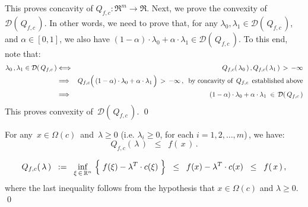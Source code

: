 This proves concavity of $Q_{f,c} : \Re^{m} \longrightarrow \Re$.
\vskip 0.2cm
\noindent
Next, we prove the convexity of $\mathcal{D}(\,Q_{f,c}\,)$.
In other words, we need to prove that,
for any $\lambda_{0}, \lambda_{1} \in \mathcal{D}(\,Q_{f,c}\,)$, and $\alpha\in[0,1]$,
we also have $(1-\alpha)\cdot\lambda_{0}+\alpha\cdot\lambda_{1}\in\mathcal{D}(\,Q_{f,c}\,)$.
To this end, note that:
\begin{eqnarray*}
\lambda_{0}\,, \lambda_{1} \in \mathcal{D}(\,Q_{f,c}\,)
& \Longleftrightarrow &
	Q_{f,c}(\,\lambda_{0}\,)\,, Q_{f,c}(\,\lambda_{1}\,) \, > \, -\infty 
\\
& \Longrightarrow &
	Q_{f,c}\!\left(\,(1-\alpha)\cdot\lambda_{0}\overset{{\color{white}.}}{+}\alpha\cdot\lambda_{1}\,\right)
	\, > \, -\infty\,,\;\;
	\textnormal{by concavity of \,$Q_{f,c}$\, established above}
\\
& \Longrightarrow &
	(1-\alpha)\cdot\lambda_{0}\overset{{\color{white}.}}{+}\alpha\cdot\lambda_{1}
	\;\in\, \mathcal{D}(\,Q_{f,c}\,)
\end{eqnarray*}
This proves convexity of \,$\mathcal{D}(\,Q_{f,c}\,)$.
\qed

\vskip 0.5cm
\begin{theorem}
\mbox{}
\vskip 0.1cm
\noindent
For any \,$x \in \Omega(c)$\, and \,$\lambda \geq 0$ (i.e. $\lambda_{i} \geq 0$, for each $i =1,2,\ldots,m$)\,,
we have:
\begin{equation*}
Q_{f,c}\!\left(\,\lambda\,\right) \;\; \leq \;\; f(\,x\,)\,.
\end{equation*}
\end{theorem}
\proof
\begin{equation*}
Q_{f,c}\!\left(\,\lambda\,\right)
\;\; := \;\;
	\underset{\xi\,\in\,\Re^{n}}{\inf}\,\left\{\;f(\xi) \overset{{\color{white}.}}{-} \lambda^{T}\cdot c(\xi)\;\right\}
\;\; \leq \;\;
	f(x) \overset{{\color{white}.}}{-} \lambda^{T}\cdot c(x)
\;\; \leq \;\;
	f(\,x\,)\,,
\end{equation*}
where the last inequality follows from the hypothesis that $x \in \Omega(c)$ and $\lambda \geq 0$.
\qed


\renewcommand{\theenumi}{\roman{enumi}}
\renewcommand{\labelenumi}{\textnormal{(\theenumi)}$\;\;$}

